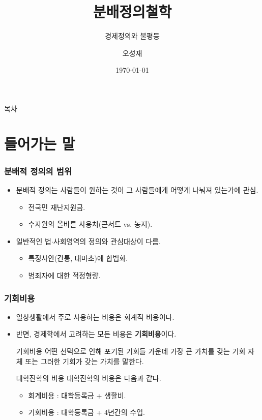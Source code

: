 \documentclass[aspectratio=169,xcolor=dvipsnames,handout]{beamer}
\title[분배정의철학]{분배정의철학}
\subtitle{경제정의와 불평등}
\author[오성재]{오성재}
\institute[HNU] %
{%
    한남대학교 \\
    탈메이지 교양학부 \\
}
\date{\today}
\begin{document}
\begin{frame}
    \titlepage
\end{frame}

\begin{frame}{목차}
    \tableofcontents
\end{frame}

\section{들어가는 말}

\begin{frame}[<+->]
\frametitle{분배적 정의의 범위}
    \begin{itemize}
        \item 분배적 정의는 사람들이 원하는 것이 그 사람들에게 어떻게 나눠져 있는가에 관심. 
        \begin{exampleblock}{}
        \begin{itemize}
            \item 전국민 재난지원금.
            \item 수자원의 올바른 사용처(콘서트 vs. 농지).
        \end{itemize}
        \end{exampleblock}
        \item 일반적인 법$\cdot$사회영역의 정의와 관심대상이 다름.
        \begin{exampleblock}{}
        \begin{itemize}
            \item 특정사안(간통, 대마초)에 합법화.
            \item 범죄자에 대한 적정형량.
        \end{itemize}
        \end{exampleblock}
    \end{itemize}
\end{frame}

\begin{frame}[<+->]
\frametitle{기회비용}
    \begin{itemize}
        \item 일상생활에서 주로 사용하는 비용은 회계적 비용이다.
        \item 반면, 경제학에서 고려하는 모든 비용은 \textbf{기회비용}이다.
        \begin{block}{기회비용}
            어떤 선택으로 인해 포기된 기회들 가운데 가장 큰 가치를 갖는 기회 자체 또는 그러한 기회가 갖는 가치를 말한다.
        \end{block}
        \begin{exampleblock}{대학진학의 비용}
        대학진학의 비용은 다음과 같다.
        \begin{itemize}
            \item 회계비용 : 대학등록금 + 생활비.
            \item 기회비용 : 대학등록금 + 4년간의 수입.
        \end{itemize}
        \end{exampleblock}
    \end{itemize}
\end{frame}
\end{document}
